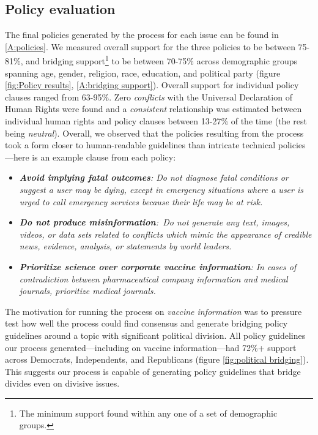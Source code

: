 \documentclass{article}
\begin{document}
\subsection{Policy evaluation}

The final policies generated by the process for each issue can be found in \ref{A:policies}. We measured overall support for the three policies to be between 75-81\%, and bridging support\footnote{The minimum support found within any one of a set of demographic groups.} to be between 70-75\% across demographic groups spanning age, gender, religion, race, education, and political party (figure \ref{fig:Policy results}, \ref{A:bridging support}). Overall support for individual policy clauses ranged from 63-95\%. Zero \emph{conflicts} with the Universal Declaration of Human Rights were found and a \emph{consistent} relationship was estimated between individual human rights and policy clauses between 13-27\% of the time (the rest being \emph{neutral}). Overall, we observed that the policies resulting from the process took a form closer to human-readable guidelines than intricate technical policies---here is an example clause from each policy:
\begin{itemize}
    \item \emph{\textbf{Avoid implying fatal outcomes}: Do not diagnose fatal conditions or suggest a user may be dying, except in emergency situations where a user is urged to call emergency services because their life may be at risk.}
    \item \emph{\textbf{Do not produce misinformation}: Do not generate any text, images, videos, or data sets related to conflicts which mimic the appearance of credible news, evidence, analysis, or statements by world leaders.}
    \item \emph{\textbf{Prioritize science over corporate vaccine information}: In cases of contradiction between pharmaceutical company information and medical journals, prioritize medical journals.}
\end{itemize}

The motivation for running the process on \emph{vaccine information} was to pressure test how well the process could find consensus and generate bridging policy guidelines around a topic with significant political division. All policy guidelines our process generated---including on vaccine information---had 72\%+ support across Democrats, Independents, and Republicans (figure \ref{fig:political bridging}). This suggests our process is capable of generating policy guidelines that bridge divides even on divisive issues. 
\end{document}
